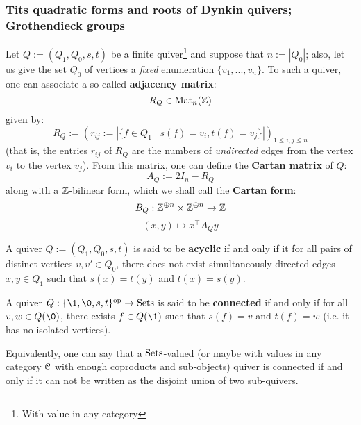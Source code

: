         \subsubsection{Tits quadratic forms and roots of Dynkin quivers; Grothendieck groups}
            \begin{definition} \label{def: cartan_quadratic_forms_of_finite_quivers}
                Let $Q := (Q_1, Q_0, s, t)$ be a finite quiver\footnote{With value in any category} and suppose that $n := |Q_0|$; also, let us give the set $Q_0$ of vertices a \textit{fixed} enumeration $\{v_1, ..., v_n\}$. To such a quiver, one can associate a so-called \textbf{adjacency matrix}:
                    $$R_Q \in \mathrm{Mat}_n(\mathbb{Z})$$
                given by:
                    $$R_Q := (r_{ij} := |\{f \in Q_1 \mid s(f) = v_i, t(f) = v_j\}|)_{1 \leq i, j \leq n}$$
                (that is, the entries $r_{ij}$ of $R_Q$ are the numbers of \textit{undirected} edges from the vertex $v_i$ to the vertex $v_j$). From this matrix, one can define the \textbf{Cartan matrix} of $Q$:
                    $$A_Q := 2I_n - R_Q$$
                along with a $\mathbb{Z}$-bilinear form, which we shall call the \textbf{Cartan form}:
                    $$B_Q: \Z^{\oplus n} \x \Z^{\oplus n} \to \Z$$
                    $$(x, y) \mapsto x^{\top} A_Q y$$                
            \end{definition}
            \begin{definition} \label{def: acyclic_quivers}
                A quiver $Q := (Q_1, Q_0, s, t)$ is said to be \textbf{acyclic} if and only if it for all pairs of distinct vertices $v, v' \in Q_0$, there does not exist simultaneously directed edges $x, y \in Q_1$ such that $s(x) = t(y)$ and $t(x) = s(y)$.
            \end{definition}
            \begin{definition} \label{def: connected_quivers}
                A quiver $Q: \{\1, \0, s, t\}^{\op} \to \Sets$ is said to be \textbf{connected} if and only if for all $v, w \in Q(\0)$, there exists $f \in Q(\1)$ such that $s(f) = v$ and $t(f) = w$ (i.e. it has no isolated vertices).
            \end{definition}
            \begin{remark}
                Equivalently, one can say that a $\mathrm{Sets}$-valued (or maybe with values in any category $\mathcal{C}$ with enough coproducts and sub-objects) quiver is connected if and only if it can not be written as the disjoint union of two sub-quivers. 
            \end{remark}
